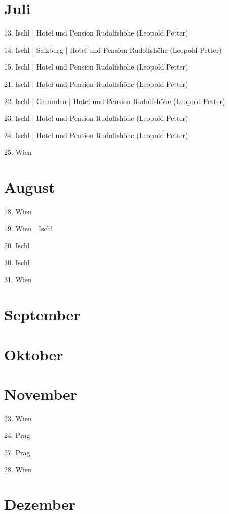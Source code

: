 \documentclass[twoside=false,titlepage=false,open=any, parskip=never, fontsize=10pt, headings=small, chapterprefix=false, appendixprefix=false, DIV=15]{scrbook}
\begin{document}
\begin{multicols}{3}
            \section*{Juli}
            13. Ischl | Hotel und Pension Rudolfshöhe (Leopold Petter)\par
            14. Ischl | Salzburg | Hotel und Pension Rudolfshöhe (Leopold Petter)\par
            15. Ischl | Hotel und Pension Rudolfshöhe (Leopold Petter)\par
            21. Ischl | Hotel und Pension Rudolfshöhe (Leopold Petter)\par
            22. Ischl | Gmunden | Hotel und Pension Rudolfshöhe (Leopold Petter)\par
            23. Ischl | Hotel und Pension Rudolfshöhe (Leopold Petter)\par
            24. Ischl | Hotel und Pension Rudolfshöhe (Leopold Petter)\par
            25. Wien\par
            \section*{August}
            18. Wien\par
            19. Wien | Ischl\par
            20. Ischl\par
            30. Ischl\par
            31. Wien\par
            \section*{September}
            \section*{Oktober}
            \section*{November}
            23. Wien\par
            24. Prag\par
            27. Prag\par
            28. Wien\par
            \section*{Dezember}

\end{multicols}
\end{document}
